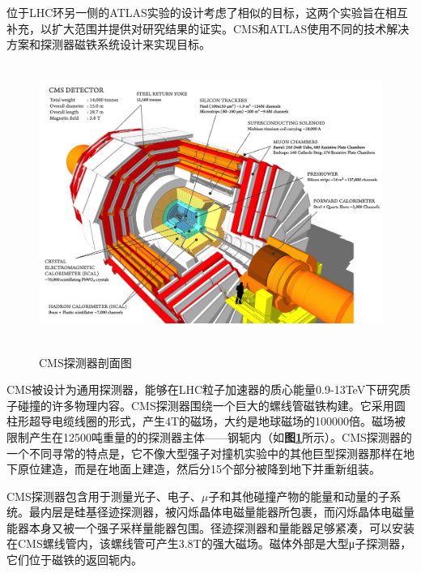 位于LHC环另一侧的ATLAS实验的设计考虑了相似的目标，这两个实验旨在相互补充，以扩大范围并提供对研究结果的证实。CMS和ATLAS使用不同的技术解决方案和探测器磁铁系统设计来实现目标。

\begin{figure}[H]
 \centering
 \caption{CMS探测器剖面图\cite{cms-detector}}
 \includegraphics[height=9cm, width=13cm]{pictures/CMS_detector.png}
 \label{fig:1.6}
\end{figure}

CMS被设计为通用探测器，能够在LHC粒子加速器的质心能量0.9-13TeV下研究质子碰撞的许多物理内容。CMS探测器围绕一个巨大的螺线管磁铁构建。它采用圆柱形超导电缆线圈的形式，产生4T的磁场，大约是地球磁场的100000倍。磁场被限制产生在12500吨重量的的探测器主体——钢轭内（如\textbf{图\ref{fig:1.6}}所示）。CMS探测器的一个不同寻常的特点是，它不像大型强子对撞机实验中的其他巨型探测器那样在地下原位建造，而是在地面上建造，然后分15个部分被降到地下并重新组装。

CMS探测器包含用于测量光子、电子、$\mu$子和其他碰撞产物的能量和动量的子系统。最内层是硅基径迹探测器，被闪烁晶体电磁量能器所包裹，而闪烁晶体电磁量能器本身又被一个强子采样量能器包围。径迹探测器和量能器足够紧凑，可以安装在CMS螺线管内，该螺线管可产生3.8T的强大磁场。磁体外部是大型μ子探测器，它们位于磁铁的返回轭内。